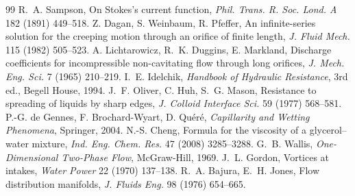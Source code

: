 \documentclass[10pt,a4paper]{article}
\begin{document}
\begin{thebibliography}{99}\small
{} R.~A. Sampson, On Stokes's current function, \emph{Phil. Trans. R. Soc. Lond. A} 182 (1891) 449--518.
 Z. Dagan, S. Weinbaum, R. Pfeffer, An infinite-series solution for the creeping motion through an orifice of finite length, \emph{J. Fluid Mech.} 115 (1982) 505--523.
 A. Lichtarowicz, R.~K. Duggins, E. Markland, Discharge coefficients for incompressible non-cavitating flow through long orifices, \emph{J. Mech. Eng. Sci.} 7 (1965) 210--219.
 I.~E. Idelchik, \emph{Handbook of Hydraulic Resistance}, 3rd ed., Begell House, 1994.
 J.~F. Oliver, C. Huh, S.~G. Mason, Resistance to spreading of liquids by sharp edges, \emph{J. Colloid Interface Sci.} 59 (1977) 568--581.
 P.-G. de Gennes, F. Brochard-Wyart, D. Qu\'er\'e, \emph{Capillarity and Wetting Phenomena}, Springer, 2004.
 N.-S. Cheng, Formula for the viscosity of a glycerol--water mixture, \emph{Ind. Eng. Chem. Res.} 47 (2008) 3285--3288.
 G.~B. Wallis, \emph{One-Dimensional Two-Phase Flow}, McGraw-Hill, 1969.
 J.~L. Gordon, Vortices at intakes, \emph{Water Power} 22 (1970) 137--138.
 R.~A. Bajura, E.~H. Jones, Flow distribution manifolds, \emph{J. Fluids Eng.} 98 (1976) 654--665.
\end{thebibliography}
\end{document}
